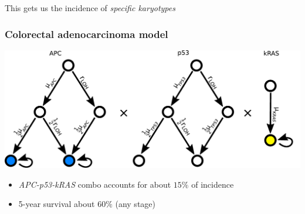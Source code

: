 \documentclass{beamer}
\begin{document}
\begin{frame}
    \;

    \begin{center}
        This gets us the incidence of \emph{specific karyotypes}
    \end{center}
\end{frame}


\begin{frame}
    \frametitle{Colorectal adenocarcinoma model}
    \begin{center}
        \includegraphics[width=1.0\textwidth]{figures/diagram5}
    \end{center}

    \begin{center}
    \begin{itemize}
        \item \emph{APC-p53-kRAS} combo accounts for about $15\%$ of incidence
        \item 5-year survival about $60\%$ (any stage)
    \end{itemize}
    \end{center}

\end{frame}
\end{document}
